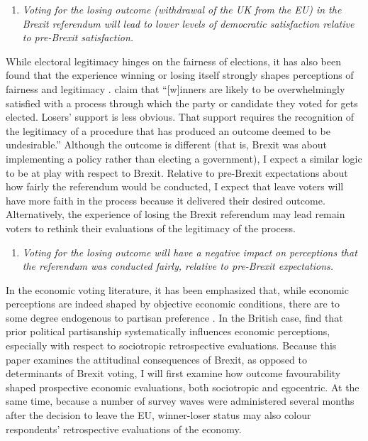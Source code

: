 \documentclass[12pt, letter]{article}
\begin{document}
\begin{enumerate}[label= \textbf{Hypothesis 1b (H1b)},  leftmargin=*]
  \item \textit{Voting for the losing outcome (withdrawal of the UK from the EU) in the Brexit referendum will lead to lower levels of democratic satisfaction relative to pre-Brexit satisfaction.}
\end{enumerate}

While electoral legitimacy hinges on the fairness of elections, it has also been found that the experience winning or losing itself strongly shapes perceptions of fairness and legitimacy \parencite{sances2015partisanship}. \textcite{nadeau1993accepting} claim that  ``[w]inners are likely to be overwhelmingly satisfied with a process through which the party or candidate they voted for gets elected. Losers’ support is less obvious. That support requires the recognition of the legitimacy of a procedure that has produced an outcome deemed to be undesirable.'' Although the outcome is different (that is, Brexit was about implementing a policy rather than electing a government), I expect a similar logic to be at play with respect to Brexit. Relative to pre-Brexit expectations about how fairly the referendum would be conducted, I expect that leave voters will have more faith in the process because it delivered their desired outcome. Alternatively, the experience of losing the Brexit referendum may lead remain voters to rethink their evaluations of the legitimacy of the process.

\vspace{12pt}
\begin{enumerate}[label= \textbf{Hypothesis 2 (H2)},  leftmargin=*]
  \item \textit{Voting for the losing outcome will have a negative impact on perceptions that the referendum was conducted fairly, relative to pre-Brexit expectations.}
\end{enumerate}

In the economic voting literature, it has been emphasized that, while economic perceptions are indeed shaped by objective economic conditions, there are to some degree endogenous to partisan preference \parencite{lewis2013vp}. In the British case, \textcite{evans2006political} find that prior political partisanship systematically influences economic perceptions, especially with respect to sociotropic retrospective evaluations. Because this paper examines the attitudinal consequences of Brexit, as opposed to determinants of Brexit voting, I will first examine how outcome favourability shaped prospective economic evaluations, both sociotropic and egocentric. At the same time, because a number of survey waves were administered several months after the decision to leave the EU, winner-loser status may also colour respondents' retrospective evaluations of the economy. 
\end{document}
